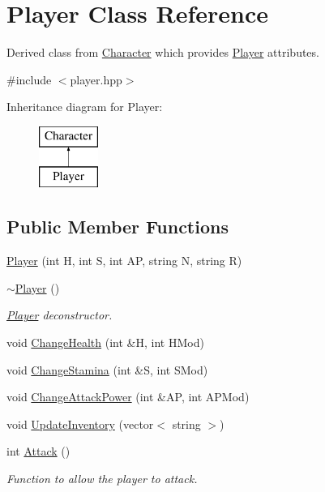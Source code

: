 \hypertarget{classPlayer}{\section{Player Class Reference}
\label{classPlayer}
}


Derived class from \hyperlink{classCharacter}{Character} which provides \hyperlink{classPlayer}{Player} attributes.  




{\ttfamily \#include $<$player.\-hpp$>$}

Inheritance diagram for Player\-:\begin{figure}[H]
\begin{center}
\leavevmode
\includegraphics[height=2.000000cm]{classPlayer}
\end{center}
\end{figure}
\subsection*{Public Member Functions}
\begin{DoxyCompactItemize}
\item 
\hyperlink{classPlayer_a187eb03426482ee7f3936f5f4a952a06}{Player} (int H, int S, int A\-P, string N, string R)
\item 
\hypertarget{classPlayer_a749d2c00e1fe0f5c2746f7505a58c062}{\hyperlink{classPlayer_a749d2c00e1fe0f5c2746f7505a58c062}{$\sim$\-Player} ()}\label{classPlayer_a749d2c00e1fe0f5c2746f7505a58c062}

\begin{DoxyCompactList}\small\item\em \hyperlink{classPlayer}{Player} deconstructor. \end{DoxyCompactList}\item 
void \hyperlink{classPlayer_af9950c6d591faee9183aad8a37f33dad}{Change\-Health} (int \&H, int H\-Mod)
\item 
void \hyperlink{classPlayer_a4ac9534d49779d6f46e0a8646bb9ed5f}{Change\-Stamina} (int \&S, int S\-Mod)
\item 
void \hyperlink{classPlayer_a6c98497cbb003bdcb85b6e5d58649609}{Change\-Attack\-Power} (int \&A\-P, int A\-P\-Mod)
\item 
void \hyperlink{classPlayer_a8ee385d70cb8ee3f2fd9070ec94e2f28}{Update\-Inventory} (vector$<$ string $>$)
\item 
\hypertarget{classPlayer_a1908922bb3f8cb3bd5b07a7321d52862}{int \hyperlink{classPlayer_a1908922bb3f8cb3bd5b07a7321d52862}{Attack} ()}\label{classPlayer_a1908922bb3f8cb3bd5b07a7321d52862}

\begin{DoxyCompactList}\small\item\em Function to allow the player to attack. \end{DoxyCompactList}\end{DoxyCompactItemize}


